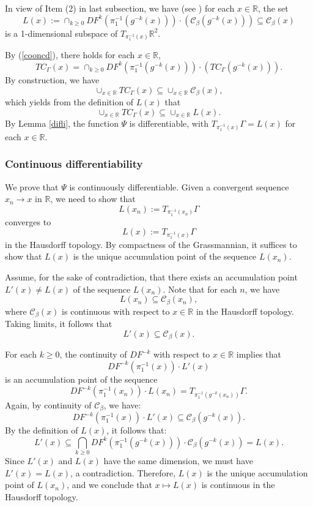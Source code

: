 \documentclass{amsart}
\newcommand{\R}{\mathbb{R}}
\theoremstyle{definition}
\begin{document}
In view of  Item (2) in last subsection, we have (see \cite[Proof of Theorem 1.2]{Ne}) for each $x\in\R$, the set
\[L(x):=\cap_{k\geq 0}DF^{k}(\pi_1^{-1}(g^{-k}(x)))\cdot (\mathcal{C}_\beta(g^{-k}(x)))\subseteq \mathcal{C}_\beta(x)\]
is a 1-dimensional subspace of $T_{\pi_1^{-1}(x)}\R^2$.

By (\ref{cooncd}), there holds for each $x\in\R$,
\[TC_{\Gamma}(x)=\cap_{k\geq 0}DF^{k}(\pi_1^{-1}(g^{-k}(x)))\cdot (TC_{\Gamma}(g^{-k}(x))).\]
By construction, we have
\[\cup_{x\in\R}TC_{\Gamma}(x)\subseteq \cup_{x\in\R}\mathcal{C}_\beta(x),\]
which yields from the definition of $L(x)$ that
\[\cup_{x\in\R}TC_{\Gamma}(x)\subseteq \cup_{x\in\R}L(x).\]
By Lemma \ref{difli}, the function $\Psi$ is differentiable, with $T_{\pi_1^{-1}(x)}\Gamma=L(x)$ for each $x\in \R$.





\subsubsection{Continuous differentiability}
We prove that $\Psi$ is continuously differentiable. Given a convergent sequence \( x_n \to x \) in $\mathbb{R}$, we need to show that
\[
L(x_n) := T_{\pi_1^{-1}(x_n)}\Gamma
\]
converges to
\[
L(x) := T_{\pi_1^{-1}(x)}\Gamma
\]
in the Hausdorff topology. By compactness of the Grassmannian, it suffices to show that \( L(x) \) is the unique accumulation point of the sequence \( L(x_n) \).

Assume, for the sake of contradiction, that there exists an accumulation point \( L'(x) \neq L(x) \) of the sequence \( L(x_n) \). Note that for each \( n \), we have
\[
L(x_n) \subseteq \mathcal{C}_\beta(x_n),
\]
where \( \mathcal{C}_\beta(x) \) is continuous with respect to \( x \in \mathbb{R} \) in the Hausdorff topology. Taking limits, it follows that
\[
L'(x) \subseteq \mathcal{C}_\beta(x).
\]

For each \( k \geq 0 \), the continuity of \( DF^{-k} \) with respect to \( x \in \mathbb{R} \) implies that
\[
DF^{-k}(\pi_1^{-1}(x)) \cdot L'(x)
\]
is an accumulation point of the sequence
\[
DF^{-k}(\pi_1^{-1}(x_n)) \cdot L(x_n) = T_{\pi_1^{-1}(g^{-k}(x_n))}\Gamma.
\]
Again, by continuity of \( \mathcal{C}_\beta \), we have:
\[
DF^{-k}(\pi_1^{-1}(x)) \cdot L'(x) \subseteq \mathcal{C}_\beta(g^{-k}(x)).
\]
By the definition of \( L(x) \), it follows that:
\[
L'(x) \subseteq \bigcap_{k \geq 0} DF^k(\pi_1^{-1}(g^{-k}(x))) \cdot \mathcal{C}_\beta(g^{-k}(x)) = L(x).
\]
Since \( L'(x) \) and \( L(x) \) have the same dimension, we must have \( L'(x) = L(x) \), a contradiction. Therefore, \( L(x) \) is the unique accumulation point of \( L(x_n) \), and we conclude that \( x \mapsto L(x) \) is continuous in the Hausdorff topology.
\end{document}
